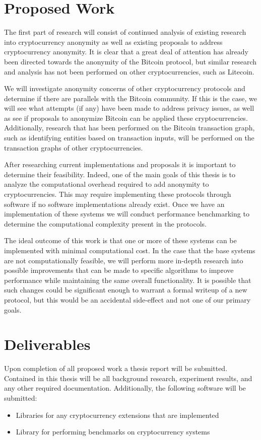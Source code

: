 \documentclass[11pt]{article}
\begin{document}
\section{Proposed Work}
The first part of research will consist of continued analysis of existing
research into cryptocurrency anonymity as well as existing proposals to address
cryptocurrency anonymity. It is clear that a great deal of attention has already
been directed towards the anonymity of the Bitcoin protocol, but similar
research and analysis has not been performed on other cryptocurrencies, such as
Litecoin.

We will investigate anonymity concerns of other cryptocurrency protocols and
determine if there are parallels with the Bitcoin community. If this is the
case, we will see what attempts (if any) have been made to address privacy
issues, as well as see if proposals to anonymize Bitcoin can be applied these
cryptocurrencies. Additionally, research that has been performed on the Bitcoin
transaction graph, such as identifying entities based on transaction inputs,
will be performed on the transaction graphs of other cryptocurrencies.

After researching current implementations and proposals it is important to
determine their feasibility. Indeed, one of the main goals of this thesis is to
analyze the computational overhead required to add anonymity to
cryptocurrencies. This may require implementing these protocols through software
if no software implementations already exist. Once we have an implementation of
these systems we will conduct performance benchmarking to determine the
computational complexity present in the protocols.

The ideal outcome of this work is that one or more of these systems can be
implemented with minimal computational cost. In the case that the base
systems are not computationally feasible, we will perform more in-depth research
into possible improvements that can be made to specific algorithms to improve
performance while maintaining the same overall functionality. It is possible
that such changes could be significant enough to warrant a formal writeup of a
new protocol, but this would be an accidental side-effect and not one of our
primary goals.

\section{Deliverables}
Upon completion of all proposed work a thesis report will be submitted.
Contained in this thesis will be all background research, experiment results,
and any other required documentation. Additionally, the following software will
be submitted:
\begin{itemize}
    \item Libraries for any cryptocurrency extensions that are implemented
    \item Library for performing benchmarks on cryptocurrency systems
\end{itemize}
\end{document}
